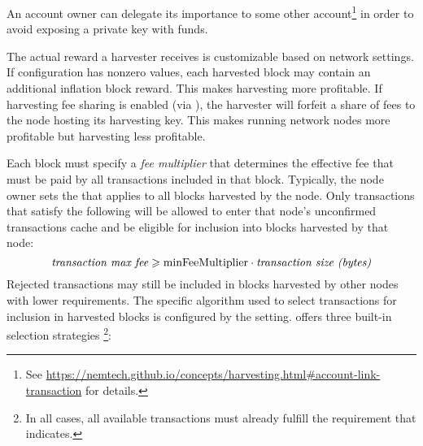 An account owner can delegate its importance to some other account\footnote{See \url{https://nemtech.github.io/concepts/harvesting.html\#account-link-transaction} for details.} in order to avoid exposing a private key with funds.

The actual reward a harvester receives is customizable based on network settings.
If  configuration has nonzero values, each harvested block may contain an additional inflation block reward.
This makes harvesting more profitable.
If harvesting fee sharing is enabled (via ), the harvester will forfeit a share of fees to the node hosting its harvesting key.
This makes running network nodes more profitable but harvesting less profitable.


Each block must specify a \textit{fee multiplier} that determines the effective fee that must be paid by all transactions included in that block.
Typically, the node owner sets the  that applies to all blocks harvested by the node.
Only transactions that satisfy the following will be allowed to enter that node's unconfirmed transactions cache and be eligible for inclusion into blocks harvested by that node:
\begin{equation}
\textit{transaction max fee} \geqslant \nemsetting{node}{minFeeMultiplier} \cdot \textit{transaction size (bytes)}
\end{equation}
Rejected transactions may still be included in blocks harvested by other nodes with lower requirements.
The specific algorithm used to select transactions for inclusion in harvested blocks is configured by the  setting.
\codenamespace offers three built-in selection strategies
\footnote{In all cases, all available transactions must already fulfill the requirement that  indicates.}:

